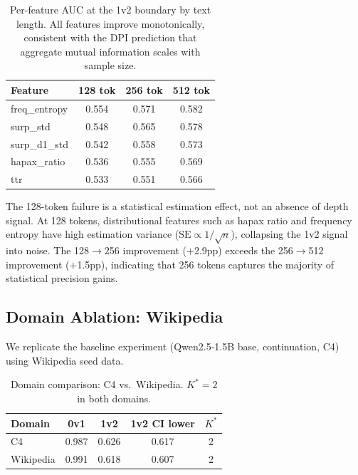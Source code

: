 \documentclass[11pt]{article}
\newcommand{\kstar}{K^{*}}
\begin{document}
\begin{table}[t]
\centering
\caption{Per-feature AUC at the 1v2 boundary by text length. All features improve monotonically, consistent with the DPI prediction that aggregate mutual information scales with sample size.}
\label{tab:perfeature_length}
\small
\begin{tabular}{lccc}
\toprule
\textbf{Feature} & \textbf{128 tok} & \textbf{256 tok} & \textbf{512 tok} \\
\midrule
freq\_entropy & 0.554 & 0.571 & 0.582 \\
surp\_std & 0.548 & 0.565 & 0.578 \\
surp\_d1\_std & 0.542 & 0.558 & 0.573 \\
hapax\_ratio & 0.536 & 0.555 & 0.569 \\
ttr & 0.533 & 0.551 & 0.566 \\
\bottomrule
\end{tabular}
\end{table}

The 128-token failure is a statistical estimation effect, not an absence of depth signal. At 128 tokens, distributional features such as hapax ratio and frequency entropy have high estimation variance ($\text{SE} \propto 1/\sqrt{n}$), collapsing the 1v2 signal into noise. The 128$\to$256 improvement ($+$2.9pp) exceeds the 256$\to$512 improvement ($+$1.5pp), indicating that 256 tokens captures the majority of statistical precision gains.

\subsection{Domain Ablation: Wikipedia}
\label{sec:domain}

We replicate the baseline experiment (Qwen2.5-1.5B base, continuation, C4) using Wikipedia seed data.

\begin{table}[t]
\centering
\caption{Domain comparison: C4 vs.\ Wikipedia. $\kstar = 2$ in both domains.}
\label{tab:domain}
\small
\begin{tabular}{lcccc}
\toprule
\textbf{Domain} & \textbf{0v1} & \textbf{1v2} & \textbf{1v2 CI lower} & $\kstar$ \\
\midrule
C4 & 0.987 & 0.626 & 0.617 & 2 \\
Wikipedia & 0.991 & 0.618 & 0.607 & 2 \\
\bottomrule
\end{tabular}
\end{table}
\end{document}
